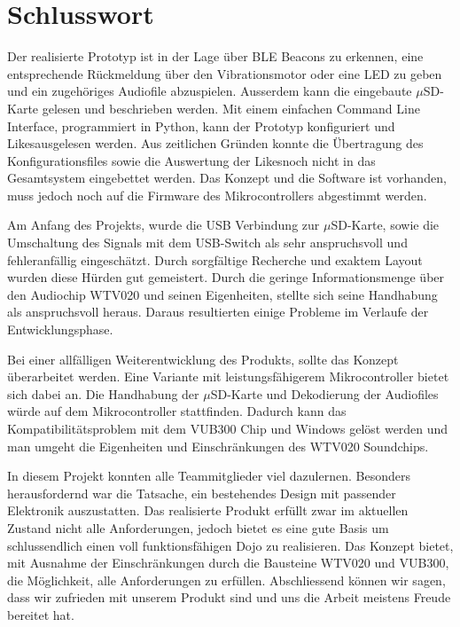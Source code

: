 \chapter{Schlusswort}
\label{Schlusswort}
\thispagestyle{fancy}  

Der realisierte Prototyp ist in der Lage über BLE Beacons zu erkennen, eine entsprechende Rückmeldung über den Vibrationsmotor oder eine LED zu geben und ein zugehöriges Audiofile abzuspielen. Ausserdem kann die eingebaute $\mu$SD-Karte gelesen und beschrieben werden. Mit einem einfachen Command Line Interface, programmiert in Python, kann der Prototyp konfiguriert und \flq Likes\frq ausgelesen werden. Aus zeitlichen Gründen konnte die Übertragung des Konfigurationsfiles sowie die Auswertung der \flq Likes\frq noch nicht in das Gesamtsystem eingebettet werden. Das Konzept und die Software ist vorhanden, muss jedoch noch auf die Firmware des Mikrocontrollers abgestimmt werden.

Am Anfang des Projekts, wurde die USB Verbindung zur $\mu$SD-Karte, sowie die Umschaltung des Signals mit dem USB-Switch als sehr anspruchsvoll und fehleranfällig eingeschätzt. Durch sorgfältige Recherche und exaktem Layout wurden diese Hürden gut gemeistert. Durch die geringe Informationsmenge über den Audiochip WTV020 und seinen Eigenheiten, stellte sich seine Handhabung als anspruchsvoll heraus. Daraus resultierten einige Probleme im Verlaufe der Entwicklungsphase.

Bei einer allfälligen Weiterentwicklung des Produkts, sollte das Konzept überarbeitet werden. Eine Variante mit leistungsfähigerem Mikrocontroller bietet sich dabei an. Die Handhabung der $\mu$SD-Karte und Dekodierung der Audiofiles würde auf dem Mikrocontroller stattfinden. Dadurch kann das Kompatibilitätsproblem mit dem VUB300 Chip und Windows gelöst werden und man umgeht die Eigenheiten und Einschränkungen des WTV020 Soundchips.

In diesem Projekt konnten alle Teammitglieder viel dazulernen. Besonders herausfordernd war die Tatsache, ein bestehendes Design mit passender Elektronik auszustatten. Das realisierte Produkt erfüllt zwar im aktuellen Zustand nicht alle Anforderungen, jedoch bietet es eine gute Basis um schlussendlich einen voll funktionsfähigen Dojo zu realisieren. Das Konzept bietet, mit Ausnahme der Einschränkungen durch die Bausteine WTV020 und VUB300, die Möglichkeit, alle Anforderungen zu erfüllen. Abschliessend können wir sagen, dass wir zufrieden mit unserem Produkt sind und uns die Arbeit meistens Freude bereitet hat.
